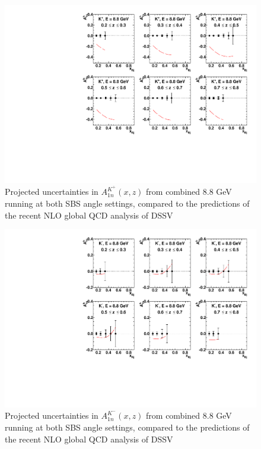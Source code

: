 \begin{figure}[h]
  \begin{center}
    \includegraphics[width=.75\textwidth]{figures/A1n_vs_x_E88_kp.pdf}
  \end{center}
  \caption{\label{A1n_kp_88gev} Projected uncertainties in $A_{1n}^{K^+}(x,z)$ from combined 8.8 GeV running at both SBS angle settings, compared to the predictions of the recent NLO global QCD analysis of DSSV~\cite{DSSVplus}}
\end{figure}
\begin{figure}[h]
  \begin{center}
    \includegraphics[width=.75\textwidth]{figures/A1n_vs_x_E88_km.pdf}
  \end{center}
  \caption{\label{A1n_km_88gev} Projected uncertainties in $A_{1n}^{K^-}(x,z)$ from combined 8.8 GeV running at both SBS angle settings, compared to the predictions of the recent NLO global QCD analysis of DSSV~\cite{DSSVplus}}
\end{figure}
